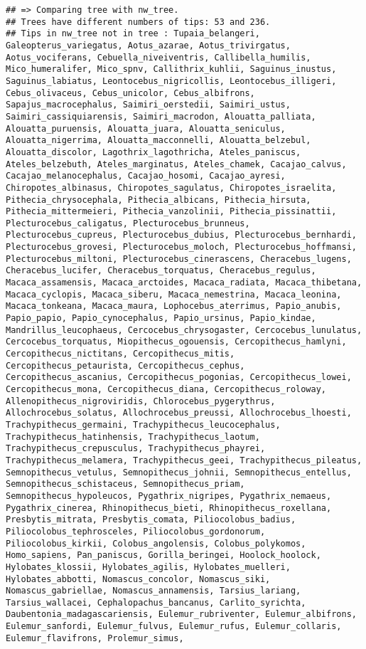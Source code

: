 \documentclass[
]{article}
\begin{document}
\begin{verbatim}
## => Comparing tree with nw_tree.
## Trees have different numbers of tips: 53 and 236.
## Tips in nw_tree not in tree : Tupaia_belangeri, Galeopterus_variegatus, Aotus_azarae, Aotus_trivirgatus, Aotus_vociferans, Cebuella_niveiventris, Callibella_humilis, Mico_humeralifer, Mico_spnv, Callithrix_kuhlii, Saguinus_inustus, Saguinus_labiatus, Leontocebus_nigricollis, Leontocebus_illigeri, Cebus_olivaceus, Cebus_unicolor, Cebus_albifrons, Sapajus_macrocephalus, Saimiri_oerstedii, Saimiri_ustus, Saimiri_cassiquiarensis, Saimiri_macrodon, Alouatta_palliata, Alouatta_puruensis, Alouatta_juara, Alouatta_seniculus, Alouatta_nigerrima, Alouatta_macconnelli, Alouatta_belzebul, Alouatta_discolor, Lagothrix_lagothricha, Ateles_paniscus, Ateles_belzebuth, Ateles_marginatus, Ateles_chamek, Cacajao_calvus, Cacajao_melanocephalus, Cacajao_hosomi, Cacajao_ayresi, Chiropotes_albinasus, Chiropotes_sagulatus, Chiropotes_israelita, Pithecia_chrysocephala, Pithecia_albicans, Pithecia_hirsuta, Pithecia_mittermeieri, Pithecia_vanzolinii, Pithecia_pissinattii, Plecturocebus_caligatus, Plecturocebus_brunneus, Plecturocebus_cupreus, Plecturocebus_dubius, Plecturocebus_bernhardi, Plecturocebus_grovesi, Plecturocebus_moloch, Plecturocebus_hoffmansi, Plecturocebus_miltoni, Plecturocebus_cinerascens, Cheracebus_lugens, Cheracebus_lucifer, Cheracebus_torquatus, Cheracebus_regulus, Macaca_assamensis, Macaca_arctoides, Macaca_radiata, Macaca_thibetana, Macaca_cyclopis, Macaca_siberu, Macaca_nemestrina, Macaca_leonina, Macaca_tonkeana, Macaca_maura, Lophocebus_aterrimus, Papio_anubis, Papio_papio, Papio_cynocephalus, Papio_ursinus, Papio_kindae, Mandrillus_leucophaeus, Cercocebus_chrysogaster, Cercocebus_lunulatus, Cercocebus_torquatus, Miopithecus_ogouensis, Cercopithecus_hamlyni, Cercopithecus_nictitans, Cercopithecus_mitis, Cercopithecus_petaurista, Cercopithecus_cephus, Cercopithecus_ascanius, Cercopithecus_pogonias, Cercopithecus_lowei, Cercopithecus_mona, Cercopithecus_diana, Cercopithecus_roloway, Allenopithecus_nigroviridis, Chlorocebus_pygerythrus, Allochrocebus_solatus, Allochrocebus_preussi, Allochrocebus_lhoesti, Trachypithecus_germaini, Trachypithecus_leucocephalus, Trachypithecus_hatinhensis, Trachypithecus_laotum, Trachypithecus_crepusculus, Trachypithecus_phayrei, Trachypithecus_melamera, Trachypithecus_geei, Trachypithecus_pileatus, Semnopithecus_vetulus, Semnopithecus_johnii, Semnopithecus_entellus, Semnopithecus_schistaceus, Semnopithecus_priam, Semnopithecus_hypoleucos, Pygathrix_nigripes, Pygathrix_nemaeus, Pygathrix_cinerea, Rhinopithecus_bieti, Rhinopithecus_roxellana, Presbytis_mitrata, Presbytis_comata, Piliocolobus_badius, Piliocolobus_tephrosceles, Piliocolobus_gordonorum, Piliocolobus_kirkii, Colobus_angolensis, Colobus_polykomos, Homo_sapiens, Pan_paniscus, Gorilla_beringei, Hoolock_hoolock, Hylobates_klossii, Hylobates_agilis, Hylobates_muelleri, Hylobates_abbotti, Nomascus_concolor, Nomascus_siki, Nomascus_gabriellae, Nomascus_annamensis, Tarsius_lariang, Tarsius_wallacei, Cephalopachus_bancanus, Carlito_syrichta, Daubentonia_madagascariensis, Eulemur_rubriventer, Eulemur_albifrons, Eulemur_sanfordi, Eulemur_fulvus, Eulemur_rufus, Eulemur_collaris, Eulemur_flavifrons, Prolemur_simus, 
\end{verbatim}
\end{document}
